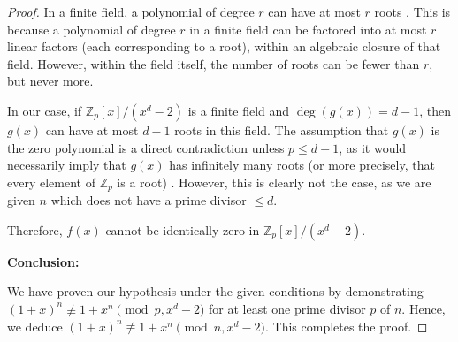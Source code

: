 \documentclass{article}
\theoremstyle{plain}
\theoremstyle{definition}
\begin{document}
\begin{proof}
In a finite field, a polynomial of degree $r$ can have at most $r$ roots \cite{dummit2004abstractalgebra}. This is because a polynomial of degree $r$ in a finite field can be factored into at most $r$ linear factors (each corresponding to a root), within an algebraic closure of that field. However, within the field itself, the number of roots can be fewer than $r$, but never more.

In our case, if $\mathbb{Z}_p[x]/(x^d - 2)$ is a finite field and $\deg(g(x)) = d-1$, then $g(x)$ can have at most $d-1$ roots in this field. The assumption that $g(x)$ is the zero polynomial is a direct contradiction unless $p \leq d-1$, as it would necessarily imply that $g(x)$ has infinitely many roots (or more precisely, that every element of $\mathbb{Z}_p$ is a root) \cite{koppartywang2014roots}. However, this is clearly not the case, as we are given $n$ which does not have a prime divisor $\leq d$.

Therefore, $f(x)$ cannot be identically zero in $\mathbb{Z}_p[x]/(x^d - 2)$.

\textbf{Conclusion:}

We have proven our hypothesis under the given conditions by demonstrating $(1 + x)^n \not\equiv 1 + x^n \pmod{p, x^d-2}$ for at least one prime divisor $p$ of $n$. Hence, we deduce $(1 + x)^n \not\equiv 1 + x^n \pmod{n, x^d-2}$. This completes the proof.
\end{proof}

\begingroup
\raggedright


\endgroup
\end{document}
